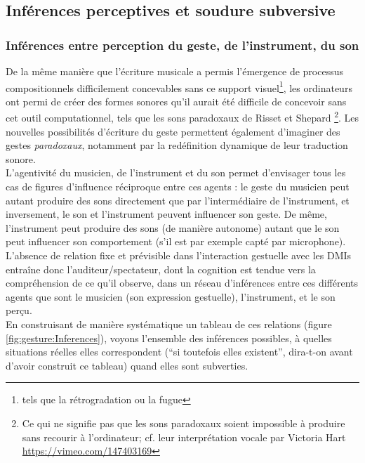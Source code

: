 \subsection{Inférences perceptives et soudure subversive}

\subsubsection{Inférences entre perception du geste, de l'instrument, du son}

\noindent De la même manière que l'écriture musicale a permis l'émergence de processus compositionnels difficilement concevables sans ce support visuel\footnote{tels que la rétrogradation ou la fugue}, les ordinateurs ont permi de créer des formes sonores qu'il aurait été difficile de concevoir sans cet outil computationnel, tels que les sons paradoxaux de Risset et Shepard \footnote{Ce qui ne signifie pas que les sons paradoxaux soient impossible à produire sans recourir à l'ordinateur; cf. leur interprétation vocale par Victoria Hart \url{https://vimeo.com/147403169}}. Les nouvelles possibilités d'écriture du geste permettent également d'imaginer des gestes \textit{paradoxaux}, notamment par la redéfinition dynamique de leur traduction sonore.\\
\indent L'agentivité du musicien, de l'instrument et du son permet d'envisager tous les cas de figures d'influence réciproque entre ces agents : le geste du musicien peut autant produire des sons directement que par l'intermédiaire de l'instrument, et inversement, le son et l'instrument peuvent influencer son geste. De même, l'instrument peut produire des sons (de manière autonome) autant que le son peut influencer son comportement (s'il est par exemple capté par microphone). L'absence de relation fixe et prévisible dans l'interaction gestuelle avec les \glspl{DMI} entraîne donc l'auditeur/spectateur, dont la cognition est tendue vers la compréhension de ce qu'il observe, dans un réseau d'inférences entre ces différents agents que sont le musicien (son expression gestuelle), l'instrument, et le son perçu.\\
\indent En construisant de manière systématique un tableau de ces relations (figure \ref{fig:gesture:Inferences}), voyons l'ensemble des inférences possibles, à quelles situations réelles elles correspondent (``si toutefois elles existent'', dira-t-on avant d'avoir construit ce tableau) quand elles sont subverties.

